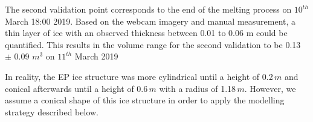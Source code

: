 \documentclass[utf8]{frontiersSCNS} %
\begin{document}
The second validation point corresponds to the end of the melting process on $10^{th}$ March 18:00 2019.  Based on the
webcam imagery and manual measurement, a thin layer of ice with an observed thickness between 0.01 to 0.06 m could be
quantified. This results in the volume range for the second validation to be 0.13 $\pm$ 0.09 $m^{3}$ on $11^{th}$ March
2019 

In reality, the EP ice structure was more cylindrical until a height of 0.2\,$m$ and conical afterwards until a
height of 0.6\,$m$ with a radius of 1.18\,$m$. However, we assume a conical shape of this ice structure in order to
apply the modelling strategy described below.


% 
% 
% 
% 

 
\end{document}
